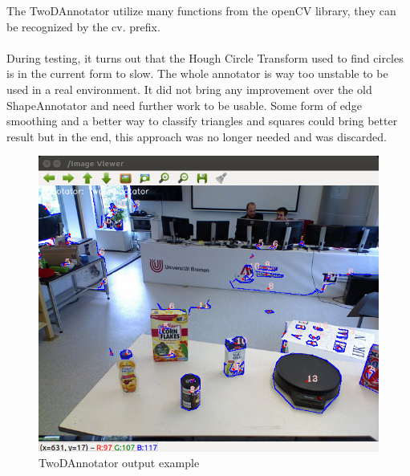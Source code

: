 \documentclass[main.tex]{subfiles}
\begin{document}
The TwoDAnnotator utilize many functions from the openCV library, they can be recognized by the cv. prefix. \\ \\
During testing, it turns out that the Hough Circle Transform used to find circles is in the current form to slow. The whole annotator is way too unstable to be used in a real environment. It did not bring any improvement over the old ShapeAnnotator and need further work to be usable. Some form of edge smoothing and a better way to classify triangles and squares could bring better result but in the end, this approach was no longer needed and was discarded.
\begin{figure}[H]
\centering
\includegraphics[width=1\textwidth]{pictures/perception/TwoDAnnotator.png}
\caption{TwoDAnnotator output example}
\end{figure}
\end{document}
